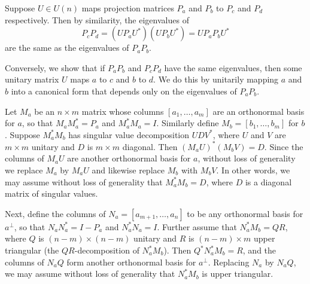 \documentclass[12pt]{article}
\numberwithin{equation}{section}
\theoremstyle{plainsl}
\renewenvironment{proof}{\noindent{{\sl Proof. }}}{\medbreak}
\begin{document}
\begin{proof}
Suppose $U \in U(n)$ maps projection matrices $P_a$ and $P_b$ to $P_c$ and $P_d$ respectively. Then by similarity, the eigenvalues of 
\[
P_cP_d = (UP_aU^*)(UP_bU^*) = UP_aP_bU^*
\]
are the same as the eigenvalues of $P_aP_b$.

Conversely, we show that if $P_aP_b$ and $P_cP_d$ have the same eigenvalues, then some unitary matrix $U$ maps $a$ to $c$ and $b$ to $d$. We do this by unitarily mapping $a$ and $b$ into a canonical form that depends only on the eigenvalues of $P_aP_b$. 

Let $M_a$ be an $n \times m$ matrix whose columns $[a_1, \ldots, a_m]$ are an orthonormal basis for $a$, so that $M_aM_a^* = P_a$ and $M_a^*M_a = I$. Similarly define $M_b = [b_1, \ldots, b_m]$ for $b$. Suppose $M_a^*M_b$ has singular value decomposition $UDV^*$, where $U$ and $V$ are $m \times m$ unitary and $D$ is $m \times m$ diagonal. Then $(M_aU)^*(M_bV) = D$. Since the columns of $M_aU$ are another orthonormal basis for $a$, without loss of generality we replace $M_a$ by $M_aU$ and likewise replace $M_b$ with $M_bV$. In other words, we may assume without loss of generality that $M_a^*M_b = D$, where $D$ is a diagonal matrix of singular values. 

Next, define the columns of $N_a = [a_{m+1},\ldots,a_n]$ to be any orthonormal basis for $a^\perp$, so that $N_aN_a^* = I-P_a$ and $N_a^*N_a = I$. Further assume that $N_a^*M_b = QR$, where $Q$ is $(n-m) \times (n-m)$ unitary and $R$ is $(n-m) \times m$ upper triangular (the $QR$-decomposition of $N_a^*M_b$). Then $Q^*N_a^*M_b = R$, and the columns of $N_aQ$ form another orthonormal basis for $a^\perp$. Replacing $N_a$ by $N_aQ$, we may assume without loss of generality that $N_a^*M_b$ is upper triangular. 


\end{proof}
\end{document}
